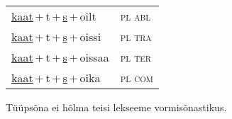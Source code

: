 \begin{minipage}{\textwidth}
\begin{sideways}
\begin{tabular}{l l}
\underline{kaat}\,+\,t\,+\,\underline{s}\,+\,oilt & \textsc{ pl abl } \\
\underline{kaat}\,+\,t\,+\,\underline{s}\,+\,oissi & \textsc{ pl tra } \\
\underline{kaat}\,+\,t\,+\,\underline{s}\,+\,oissaa & \textsc{ pl ter } \\
\underline{kaat}\,+\,t\,+\,\underline{s}\,+\,oika & \textsc{ pl com } \\
\end{tabular}
\end{sideways}
\label{tab:tüüpsõnamall-kaatsõd}

\end{minipage}

 
\vspace{1em}
\noindent Tüüpsõna ei hõlma teisi lekseeme vormi\-sõnastikus.
